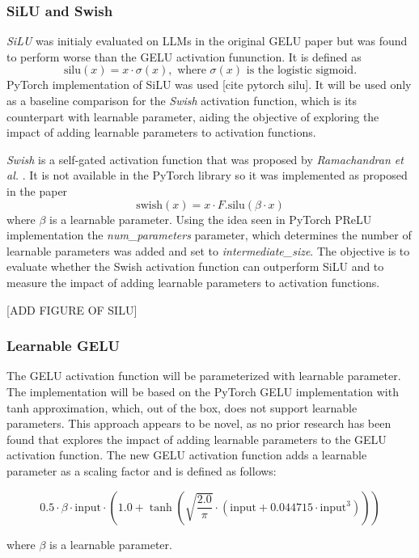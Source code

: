 \subsubsection{SiLU and Swish}
\textit{SiLU} was initialy evaluated on LLMs in the original GELU paper \cite{Hendrycks2023} but was found to perform worse than the GELU activation fununction. It is defined as 
\[
\text{silu}(x) = x \cdot \sigma(x), \text{ where } \sigma(x) \text{ is the logistic sigmoid.}
\]
PyTorch implementation of SiLU was used [cite pytorch silu].
It will be used only as a baseline comparison for the \textit{Swish} activation function, which is its counterpart with learnable parameter, aiding the objective of exploring the impact of adding learnable parameters to activation functions. 

\textit{Swish} is a self-gated activation function that was proposed by \textit{Ramachandran et al.} \cite{Ramachandran2017}. It is not available in the PyTorch library so it was implemented as proposed in the paper 
\[
    \text{swish}(x) = x \cdot F.\text{silu}(\beta \cdot x)
\]
where \(\beta\) is a learnable parameter. Using the idea seen in PyTorch PReLU implementation the \textit{num\_parameters} parameter, which determines the number of learnable parameters was added and set to \textit{intermediate\_size}. The objective is to evaluate whether the Swish activation function can outperform SiLU and to measure the impact of adding learnable parameters to activation functions.

[ADD FIGURE OF SILU]

\subsubsection{Learnable GELU}
The GELU activation function will be parameterized with learnable parameter. The implementation will be based on the PyTorch GELU implementation with tanh approximation, which, out of the box, does not support learnable parameters. This approach appears to be novel, as no prior research has been found that explores the impact of adding learnable parameters to the GELU activation function. The new GELU activation function adds a learnable parameter as a scaling factor and is defined as follows:

\[
    0.5 \cdot \beta \cdot \text{input} \cdot \left( 1.0 + \tanh \left( \sqrt{\frac{2.0}{\pi}} \cdot (\text{input} + 0.044715 \cdot \text{input}^3) \right) \right)
\]

where \(\beta\) is a learnable parameter. 

